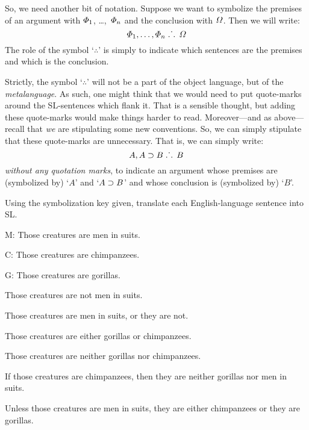 {So, we need another bit of notation. Suppose we want to symbolize the premises of an argument with $\varPhi{}_1$, \dots,~$\varPhi{}_n$ and the conclusion with $\varOmega{}$. Then we will write:
$$\varPhi{}_1, \ldots, \varPhi{}_n \; \ldotp\dot{}\,\ldotp \; \varOmega{}$$
The role of the symbol `$\therefore$' is simply to indicate which sentences are the premises and which is the conclusion.


Strictly, the symbol `$\therefore$' will not be a part of the object language, but of the \emph{metalanguage}. As such, one might think that we would need to put quote-marks around the SL-sentences which flank it. That is a sensible thought, but adding these quote-marks would make things harder to read. Moreover---and as above---recall that \emph{we} are stipulating some new conventions. So, we can simply stipulate that these quote-marks are unnecessary. That is, we can simply write:
$$A, A \supset B \; \ldotp\dot{}\,\ldotp \; B$$
\emph{without any quotation marks}, to indicate an argument whose premises are (symbolized by) `$A$' and `$A \supset B$' and whose conclusion is (symbolized by) `$B$'.



\iffalse

\practiceproblems

\solutions
\problempart Using the symbolization key given, translate each English-language sentence into SL.
\label{pr.monkeysuits}
\begin{ekey}
\item[M:] Those creatures are men in suits. 
\item[C:] Those creatures are chimpanzees. 
\item[G:] Those creatures are gorillas.
\end{ekey}
\begin{earg}
\item Those creatures are not men in suits.
\item Those creatures are men in suits, or they are not.
\item Those creatures are either gorillas or chimpanzees.
\item Those creatures are neither gorillas nor chimpanzees.
\item If those creatures are chimpanzees, then they are neither gorillas nor men in suits.
\item Unless those creatures are men in suits, they are either chimpanzees or they are gorillas.
\end{earg}


}
